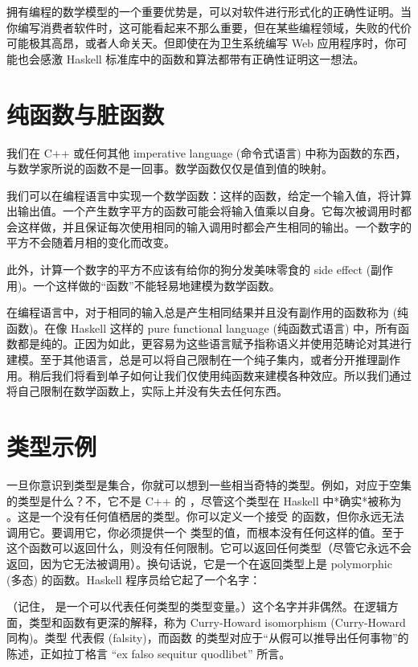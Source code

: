 拥有编程的数学模型的一个重要优势是，可以对软件进行形式化的正确性证明。当你编写消费者软件时，这可能看起来不那么重要，但在某些编程领域，失败的代价可能极其高昂，或者人命关天。但即使在为卫生系统编写 Web 应用程序时，你可能也会感激 Haskell 标准库中的函数和算法都带有正确性证明这一想法。

\section{纯函数与脏函数}

我们在 C++ 或任何其他 imperative language (命令式语言) 中称为函数的东西，与数学家所说的函数不是一回事。数学函数仅仅是值到值的映射。

我们可以在编程语言中实现一个数学函数：这样的函数，给定一个输入值，将计算出输出值。一个产生数字平方的函数可能会将输入值乘以自身。它每次被调用时都会这样做，并且保证每次使用相同的输入调用时都会产生相同的输出。一个数字的平方不会随着月相的变化而改变。

此外，计算一个数字的平方不应该有给你的狗分发美味零食的 side effect (副作用)。一个这样做的“函数”不能轻易地建模为数学函数。

在编程语言中，对于相同的输入总是产生相同结果并且没有副作用的函数称为  (纯函数)。在像 Haskell 这样的 pure functional language (纯函数式语言) 中，所有函数都是纯的。正因为如此，更容易为这些语言赋予指称语义并使用范畴论对其进行建模。至于其他语言，总是可以将自己限制在一个纯子集内，或者分开推理副作用。稍后我们将看到单子如何让我们仅使用纯函数来建模各种效应。所以我们通过将自己限制在数学函数上，实际上并没有失去任何东西。

\section{类型示例}

一旦你意识到类型是集合，你就可以想到一些相当奇特的类型。例如，对应于空集的类型是什么？不，它不是 C++ 的 ，尽管这个类型在 Haskell 中*确实*被称为 。这是一个没有任何值栖居的类型。你可以定义一个接受  的函数，但你永远无法调用它。要调用它，你必须提供一个  类型的值，而根本没有任何这样的值。至于这个函数可以返回什么，则没有任何限制。它可以返回任何类型（尽管它永远不会返回，因为它无法被调用）。换句话说，它是一个在返回类型上是 polymorphic (多态) 的函数。Haskell 程序员给它起了一个名字：

（记住， 是一个可以代表任何类型的类型变量。）这个名字并非偶然。在逻辑方面，类型和函数有更深的解释，称为 Curry-Howard isomorphism (Curry-Howard 同构)。类型  代表假 (falsity)，而函数  的类型对应于“从假可以推导出任何事物”的陈述，正如拉丁格言 “ex falso sequitur quodlibet” 所言。

